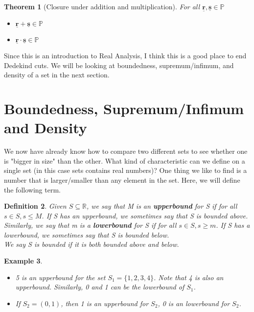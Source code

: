 \documentclass{book}
\newtheorem{theorem}{Theorem}[section]
\newtheorem{definition}[theorem]{Definition}
\newtheorem{example}[theorem]{Example}
\begin{document}
\begin{theorem}[Closure under addition and multiplication]
    For all $\underline{\mathbf{r}}, \underline{\mathbf{s}} \in \mathbb{P}$
    \begin{itemize}
        \item[(1)] $\underline{\mathbf{r}} + \underline{\mathbf{s}} \in \mathbb{P}$
        \item[(2)] $\underline{\mathbf{r}} \cdot \underline{\mathbf{s}} \in \mathbb{P}$
    \end{itemize}
\end{theorem}

Since this is an introduction to Real Analysis, I think this is a good place to end Dedekind cuts. We will be looking at boundedness, supremum/infimum, and density of a set in the next section.

\section{Boundedness, Supremum/Infimum and Density}
We now have already know how to compare two different sets to see whether one is "bigger in size" than the other. What kind of characteristic can we define on a single set (in this case sets contains real numbers)? One thing we like to find is a number that is larger/smaller than any element in the set. Here, we will define the following term.

\begin{definition}
    Given $S \subseteq \mathbb{R}$, we say that M is an \textbf{upperbound} for S if for all $s \in S, s \leq M$. If S has an upperbound, we sometimes say that S is bounded above.\\
    Similarly, we say that m is a \textbf{lowerbound} for S if for all $s \in S, s \geq m$. If S has a lowerbound, we sometimes say that S is bounded below. \\
    We say S is bounded if it is both bounded above and below.
\end{definition}

\begin{example} \label{Example 1.9.2}
    \begin{itemize}
        \item[(1)] 5 is an upperbound for the set $S_{1} = \{ 1, 2, 3, 4 \}$. Note that 4 is also an upperbound. Similarly, 0 and 1 can be the lowerbound of $S_{1}$. 
        \item[(2)] If $S_{2} = (0,1)$, then 1 is an upperbound for $S_{2}$, 0 is an lowerbound for $S_{2}$.
    \end{itemize}
\end{example}
\end{document}
